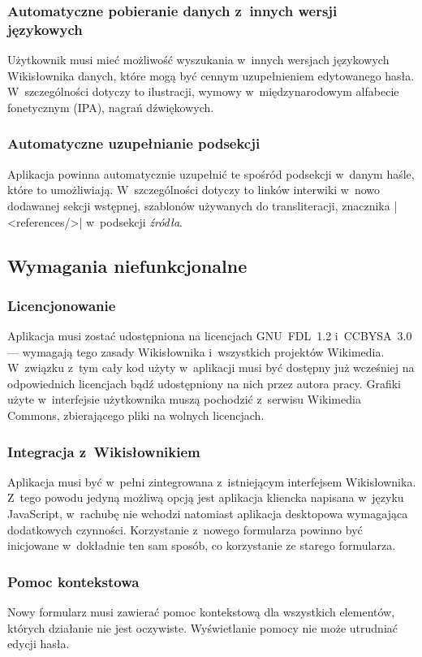 \subsubsection{Automatyczne pobieranie danych z~innych wersji językowych}
Użytkownik musi mieć możliwość wyszukania w~innych wersjach językowych Wikisłownika danych, które mogą być cennym uzupełnieniem edytowanego hasła. W~szczególności dotyczy to ilustracji, wymowy w~międzynarodowym alfabecie fonetycznym (IPA), nagrań dźwiękowych.%

\subsubsection{Automatyczne uzupełnianie podsekcji}
Aplikacja powinna automatycznie uzupełnić te spośród podsekcji w~danym haśle, które to umożliwiają. W~szczególności dotyczy to linków interwiki w~nowo dodawanej sekcji wstępnej, szablonów używanych do transliteracji, znacznika \kod|<references/>| w~podsekcji \emph{źródła}.%

\subsection{Wymagania niefunkcjonalne}
\subsubsection{Licencjonowanie}
Aplikacja musi zostać udostępniona na licencjach GNU~FDL~1.2 i~CC\dywiz{}BY\dywiz{}SA~3.0 --- wymagają tego zasady Wikisłownika i~wszystkich projektów Wikimedia. W~związku z~tym cały kod użyty w~aplikacji musi być dostępny już wcześniej na odpowiednich licencjach bądź udostępniony na nich przez autora pracy. Grafiki użyte w~interfejsie użytkownika muszą pochodzić z~serwisu Wikimedia Commons, zbierającego pliki na wolnych licencjach.

\subsubsection{Integracja z~Wikisłownikiem}
Aplikacja musi być w~pełni zintegrowana z~istniejącym interfejsem Wikisłownika. Z~tego powodu jedyną możliwą opcją jest aplikacja kliencka napisana w~języku JavaScript, w~rachubę nie wchodzi natomiast aplikacja desktopowa wymagająca dodatkowych czynności. Korzystanie z~nowego formularza powinno być inicjowane w~dokładnie ten sam sposób, co korzystanie ze starego formularza.

\subsubsection{Pomoc kontekstowa}
Nowy formularz musi zawierać pomoc kontekstową dla wszystkich elementów, których działanie nie jest oczywiste. Wyświetlanie pomocy nie może utrudniać edycji hasła.

